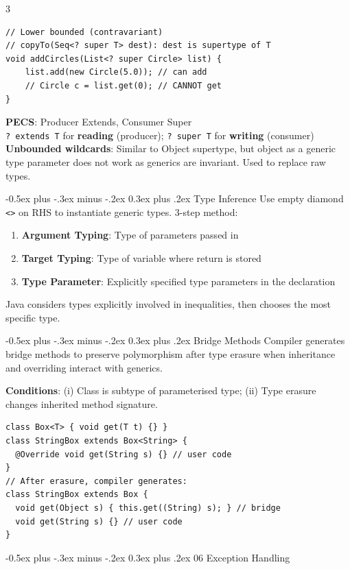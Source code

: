 \documentclass[10pt]{article}
\makeatletter
\renewcommand{\section}{\@startsection{section}{1}{0mm}%
                                {-0.5ex plus -.3ex minus -.2ex}%
                                {0.3ex plus .2ex}%
                                {\normalfont\large\bfseries}}
\renewcommand{\subsection}{\@startsection{subsection}{2}{0mm}%
                                {-0.5ex plus -.3ex minus -.2ex}%
                                {0.3ex plus .2ex}%
                                {\normalfont\normalsize\bfseries}}
\makeatother
\begin{document}
\begin{multicols}{3}
\begin{verbatim}
// Lower bounded (contravariant)
// copyTo(Seq<? super T> dest): dest is supertype of T
void addCircles(List<? super Circle> list) {
    list.add(new Circle(5.0)); // can add
    // Circle c = list.get(0); // CANNOT get
}
\end{verbatim}
\textbf{PECS}: Producer Extends, Consumer Super\\
\texttt{? extends T} for \textbf{reading} (producer); \texttt{? super T} for \textbf{writing} (consumer)\\
\textbf{Unbounded wildcards}: Similar to Object supertype, but object as a generic type parameter does not work as generics are invariant. Used to replace raw types.

\subsection{Type Inference}
Use empty diamond \texttt{<>} on RHS to instantiate generic types. 3-step method:
\begin{enumerate}
  \item \textbf{Argument Typing}: Type of parameters passed in
  \item \textbf{Target Typing}: Type of variable where return is stored
  \item \textbf{Type Parameter}: Explicitly specified type parameters in the declaration
\end{enumerate}
Java considers types explicitly involved in inequalities, then chooses the most specific type.

\section{Bridge Methods}
Compiler generates bridge methods to preserve polymorphism after type erasure when inheritance and overriding interact with generics.

\textbf{Conditions}: (i) Class is subtype of parameterised type; (ii) Type erasure changes inherited method signature.
\begin{verbatim}
class Box<T> { void get(T t) {} }
class StringBox extends Box<String> {
  @Override void get(String s) {} // user code
}
// After erasure, compiler generates:
class StringBox extends Box {
  void get(Object s) { this.get((String) s); } // bridge
  void get(String s) {} // user code
}
\end{verbatim}

\section{06 Exception Handling}

\end{multicols}
\end{document}
